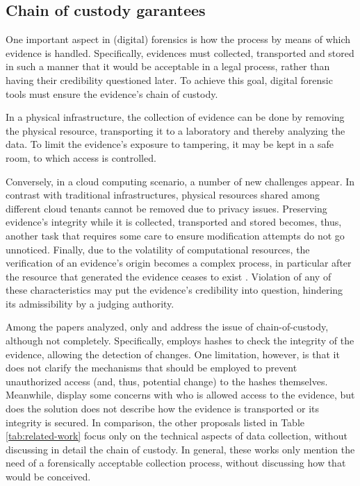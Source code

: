 \documentclass[conference]{IEEEtran}
\newcommand{\marcos}[1]{{\color{green}{MARCOS: #1}}}
\begin{document}
\subsection{Chain of custody garantees}
\label{sec:related-chainofcustody}


One important aspect in (digital) forensics is how the process by means of which evidence is handled.
%
Specifically, evidences must collected, transported and stored in such a manner that it would be acceptable in a legal process, rather than having their credibility questioned later.
%
To achieve this goal, digital forensic tools must ensure the evidence's chain of custody.


In a physical infrastructure, the collection of evidence can be done by removing the physical resource, transporting it to a laboratory and thereby analyzing the data. 
%
To limit the evidence's exposure to tampering, it may be kept in a safe room, to which access is controlled.


Conversely, in a cloud computing scenario, a number of new challenges appear. 
%
In contrast with traditional infrastructures, physical resources shared among different cloud tenants cannot be removed due to privacy issues. 
%
Preserving evidence's integrity while it is collected, transported and stored becomes, thus, another task that requires some care to ensure modification attempts do not go unnoticed.
%
Finally, due to the volatility of computational resources, the verification of an evidence's origin becomes a complex process, in particular after the resource that generated the evidence ceases to exist \cite{Simou_Cloud_Chlng:2014}.
%
Violation of any of these characteristics may put the evidence's credibility into question, hindering its admissibility by a judging authority.


Among the papers analyzed, only \cite{Sang_Log_approach:2013} and \cite{VanBaar_FAAS:2014} address the issue of chain-of-custody, although not completely. 
%
Specifically, \cite{Sang_Log_approach:2013} employs hashes to check the integrity of the evidence, allowing the detection of changes. 
%
One limitation, however, is that it does not clarify the mechanisms that should be employed to prevent unauthorized access (and, thus, potential change) to the hashes themselves.
%
Meanwhile, \cite{VanBaar_FAAS:2014} display some concerns with who is allowed access to the evidence, but does the solution does not describe how the evidence is transported or its integrity is secured.
%
In comparison, the other proposals listed in Table \ref{tab:related-work} focus only on the technical aspects of data collection, without discussing in detail the chain of custody.
%
In general, these works only mention the need of a forensically acceptable collection process, without discussing how that would be conceived.
\end{document}
